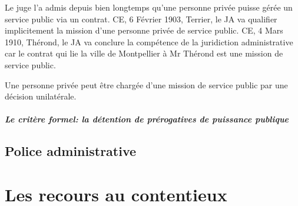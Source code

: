 \documentclass[10pt, a4paper, openany]{book}
\begin{document}
Le juge l'a admis depuis bien longtemps qu'une personne privée puisse gérée un service public via un contrat. CE, 6 Février 1903, Terrier, le JA va qualifier implicitement la mission d'une personne privée de service public. CE, 4 Mars 1910, Thérond, le JA va conclure la compétence de la juridiction administrative car le contrat qui lie la ville de Montpellier à Mr Thérond est une mission de service public. 


Une personne privée peut être chargée d'une mission de service public par une décision unilatérale. 















\subsubsection{Le critère formel: la détention de prérogatives de puissance publique}










\chapter{Police administrative}


\part{Les recours au contentieux}
\end{document}
